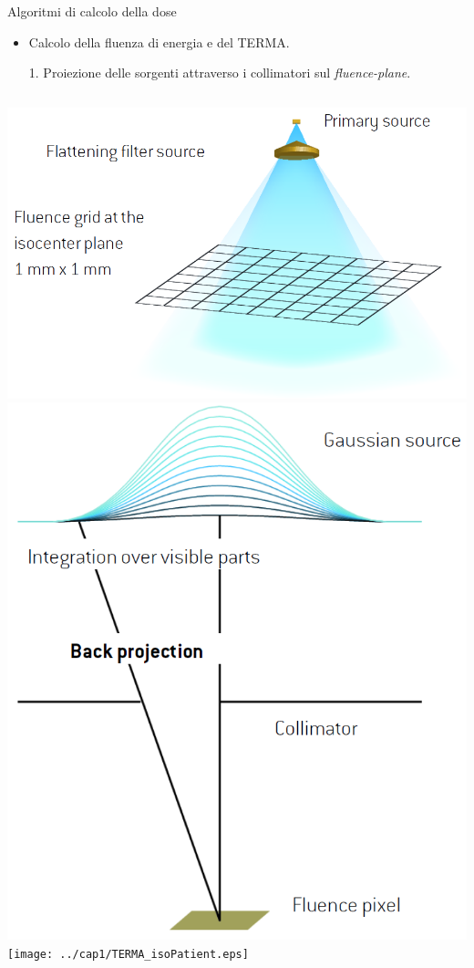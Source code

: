 \documentclass{beamer}
\begin{document}
\begin{frame}{Algoritmi di calcolo della dose}
\scriptsize
\begin{itemize}
\scriptsize
\item \color{red}Calcolo della fluenza di energia e del TERMA.
\end{itemize}
\vspace{.2cm}
\scriptsize
\begin{enumerate}
\item[1.] Proiezione delle sorgenti attraverso i collimatori sul \textit{fluence-plane}.
\end{enumerate}
\begin{columns}
\includegraphics[width=\textwidth]{../cap1/twosources.png}
\includegraphics[width=\textwidth]{../cap1/source_int.png}
\texttt{[image: ../cap1/TERMA\_isoPatient.eps]}
\end{columns}


\end{frame}
\end{document}
